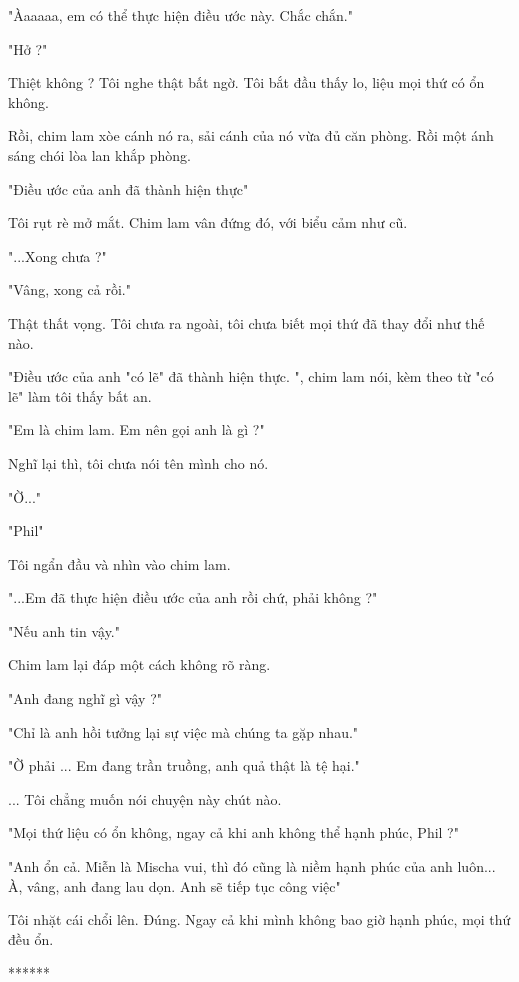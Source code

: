 "Àaaaaa, em có thể thực hiện điều ước này. Chắc chắn."

"Hở ?"

Thiệt không ? Tôi nghe thật bất ngờ. Tôi bắt đầu thấy lo, liệu mọi thứ có ổn không.

Rồi, chim lam xòe cánh nó ra, sải cánh của nó vừa đủ căn phòng. Rồi một ánh sáng chói lòa lan khắp phòng.

"Điều ước của anh đã thành hiện thực"

Tôi rụt rè mở mắt. Chim lam vân đứng đó, với biểu cảm như cũ.

"...Xong chưa ?"

"Vâng, xong cả rồi."

Thật thất vọng. Tôi chưa ra ngoài, tôi chưa biết mọi thứ đã thay đổi như thế nào.

"Điều ước của anh "có lẽ" đã thành hiện thực. ", chim lam nói, kèm theo từ "có lẽ" làm tôi thấy bất an.

"Em là chim lam. Em nên gọi anh là gì ?"

Nghĩ lại thì, tôi chưa nói tên mình cho nó.

"Ờ..."

"Phil"

Tôi ngẩn đầu và nhìn vào chim lam.

"...Em đã thực hiện điều ước của anh rồi chứ, phải không ?"

"Nếu anh tin vậy."

Chim lam lại đáp một cách không rõ ràng.

"Anh đang nghĩ gì vậy ?"

"Chỉ là anh hồi tưởng lại sự việc mà chúng ta gặp nhau."

"Ờ phải ... Em đang trần truồng, anh quả thật là tệ hại."

... Tôi chẳng muốn nói chuyện này chút nào.

"Mọi thứ liệu có ổn không, ngay cả khi anh không thể hạnh phúc, Phil ?"

"Anh ổn cả. Miễn là Mischa vui, thì đó cũng là niềm hạnh phúc của anh luôn... À, vâng, anh đang lau dọn. Anh sẽ tiếp tục công việc"

Tôi nhặt cái chổi lên. Đúng. Ngay cả khi mình không bao giờ hạnh phúc, mọi thứ đều ổn.

\begin{center}
	******
\end{center}

